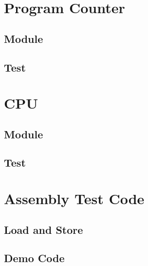 \documentclass[11pt]{article}
\begin{document}
\section{Program Counter}
\subsection{Module}
\tiny 
\subsection{Test}
\tiny 
\section{CPU}
\subsection{Module}
\tiny 
\subsection{Test}
\tiny 
\section{Assembly Test Code}
\subsection{Load and Store}
\tiny 
\subsection{Demo Code}
\tiny 
\end{document}
